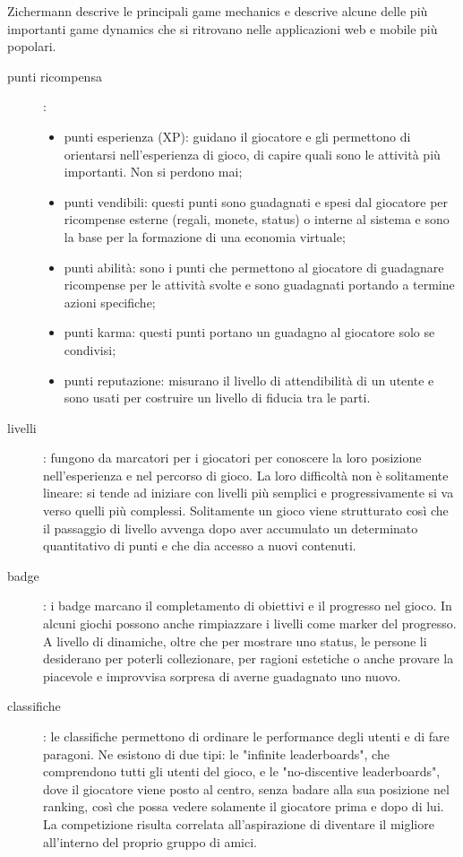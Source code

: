 Zichermann descrive le principali game mechanics e descrive alcune delle più importanti game dynamics che si ritrovano nelle applicazioni web e mobile più popolari.

\begin{description}
    \item[punti ricompensa]:
    \begin{itemize}
        \item punti esperienza (XP): guidano il giocatore e gli permettono di orientarsi nell'esperienza di gioco, di capire quali sono le attività più importanti. Non si perdono mai;
        \item punti vendibili: questi punti sono guadagnati e spesi dal giocatore per ricompense esterne (regali, monete, status) o interne al sistema e sono la base per la formazione di una economia virtuale;
        \item punti abilità: sono i punti che permettono al giocatore di guadagnare ricompense per le attività svolte e sono guadagnati portando a termine azioni specifiche;
        \item punti karma: questi punti portano un guadagno al giocatore solo se condivisi;
        \item punti reputazione: misurano il livello di attendibilità di un utente e sono usati per costruire un livello di fiducia tra le parti.
    \end{itemize} 
    \item[livelli]: fungono da marcatori per i giocatori per conoscere la loro posizione nell'esperienza e nel percorso di gioco. La loro difficoltà non è solitamente lineare: si tende ad iniziare con livelli più semplici e progressivamente si va verso quelli più complessi. Solitamente un gioco viene strutturato così che il passaggio di livello avvenga dopo aver accumulato un determinato quantitativo di punti e che dia accesso a nuovi contenuti.
    \item[badge]: i badge marcano il completamento di obiettivi e il progresso nel gioco. In alcuni giochi possono anche rimpiazzare i livelli come marker del progresso. A livello di dinamiche, oltre che per mostrare uno status, le persone li desiderano per poterli collezionare, per ragioni estetiche o anche provare la piacevole e improvvisa sorpresa di averne guadagnato uno nuovo.
    \item[classifiche]: le classifiche permettono di ordinare le performance degli utenti e di fare paragoni. Ne esistono di due tipi: le "infinite leaderboards", che comprendono tutti gli utenti del gioco, e le "no-discentive leaderboards", dove il giocatore viene posto al centro, senza badare alla sua posizione nel ranking, così che possa vedere solamente il giocatore prima e dopo di lui. La competizione risulta correlata all'aspirazione di diventare il migliore all'interno del proprio gruppo di amici.

\end{description}
